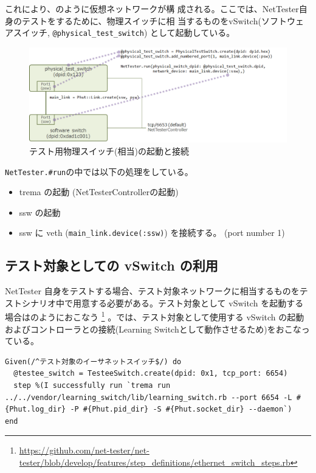 これにより、のように仮想ネットワークが構
成される。ここでは、NetTester自身のテストをするために、物理スイッチに相
当するものをvSwitch(ソフトウェアスイッチ, \verb|@physical_test_switch|)
として起動している。

\begin{figure}[h]
 \centering
 \includegraphics[scale=0.6]{img/phut-psw-ssw-model.png}
 \caption{テスト用物理スイッチ(相当)の起動と接続}
 \label{fig:phut-psw-ssw-model}
\end{figure}

\verb|NetTester.#run|の中では以下の処理をしている。

\begin{itemize}
 \item trema の起動 (NetTesterControllerの起動)
 \item ssw の起動
 \item ssw に veth (\verb|main_link.device(:ssw)|) を接続する。
       (port number 1)
\end{itemize}

\subsection{テスト対象としての vSwitch の利用}

NetTester 自身をテストする場合、テスト対象ネットワークに相当するものをテ
ストシナリオ中で用意する必要がある。テスト対象として vSwitch を起動する
場合はのようにおこなう
\footnote{\url{https://github.com/net-tester/net-tester/blob/develop/features/step_definitions/ethernet_switch_steps.rb}}
。では、テスト対象として使用する vSwitch の起動
およびコントローラとの接続(Learning Switchとして動作させるため)をおこなっ
ている。

\begin{lstlisting}[caption=vSwitchの起動,label=lst:run-vswitch]
Given(/^テスト対象のイーサネットスイッチ$/) do
  @testee_switch = TesteeSwitch.create(dpid: 0x1, tcp_port: 6654)
  step %(I successfully run `trema run ../../vendor/learning_switch/lib/learning_switch.rb --port 6654 -L #{Phut.log_dir} -P #{Phut.pid_dir} -S #{Phut.socket_dir} --daemon`)
end
\end{lstlisting}

